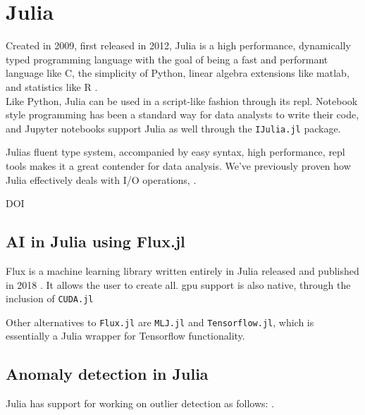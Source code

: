 \section{Julia}

Created in 2009, first released in 2012, Julia is a high performance, dynamically typed programming language with the goal of being a fast and performant language like C, the simplicity of Python, linear algebra extensions like matlab, and statistics like R \cite{julia}. \\ 

Like Python, Julia can be used in a script-like fashion through its \acrfull{repl}. Notebook style programming has been a standard way for data analysts to write their code, and Jupyter notebooks support Julia as well through the \texttt{IJulia.jl} package. 

Julias fluent type system, accompanied by easy syntax, high performance, \acrshort{repl} tools makes it a great contender for data analysis. We've previously proven how Julia effectively deals with I/O operations, \cite{projthesis}.


DOI \cite{doi:10.1137/141000671}

\subsection{AI in Julia using Flux.jl}
\label{back:flux}

Flux is a machine learning library written entirely in Julia released and published in 2018 \cite{Flux.jl-2018} \cite{Innes2018}. It allows the user to create all. \acrshort{gpu} support is also native, through the inclusion of \texttt{CUDA.jl}

Other alternatives to \texttt{Flux.jl} are \texttt{MLJ.jl} and \texttt{Tensorflow.jl}, which is essentially a Julia wrapper for Tensorflow functionality. 

\subsection{Anomaly detection in Julia}

Julia has support for working on outlier detection as follows: \cite{muhr2022outlierdetectionjl}.




